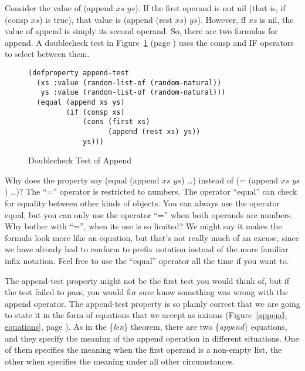 Consider the value of (append $xs$ $ys$).
If the first operand is not nil (that is, if (consp $xs$) is true),
that value is (append (rest $xs$) $ys$).
However, ff $xs$ is nil, the value of append
is simply its second operand.
So, there are two formulas for append.
A doublecheck test in Figure~\ref{fig:append-test} (page \pageref{fig:append-test}) 
uses the consp and IF operators to select between them.

\begin{figure}
\begin{Verbatim}
(defproperty append-test
  (xs :value (random-list-of (random-natural))
   ys :value (random-list-of (random-natural)))
  (equal (append xs ys)
         (if (consp xs)
             (cons (first xs)
                   (append (rest xs) ys))
             ys)))
\end{Verbatim}
\caption{Doublecheck Test of Append}
\label{fig:append-test}
\end{figure}

\begin{aside}
Why does the property say (equal (append $xs$ $ys$) \dots)
instead of (= (append $xs$ $ys$) \dots)?
The ``='' operator
is restricted to numbers. The operator ``equal'' can check
for equality between other kinds of objects.
You can always use the operator equal,
but you can only use the operator ``='' when both operands are numbers.
Why bother with ``='', when its use is so limited?
We might say it makes the formula look more like an equation,
but that's not really much of an excuse,
since we have already had to conform to prefix notation
instead of the more familiar infix notation.
Feel free to use the ``equal'' operator all the time if you want to.
\caption{``equal'' vs ``=''}
\label{equal}
\end{aside}

The append-test property might not be the first test you would think of,
but if the test failed to pass,
you would for sure know something was wrong with the append operator.
The append-test property is so plainly correct that
we are going to state it in the form of equations that we accept as axioms
(Figure~\ref{append-equations}, page \pageref{append-equations}).
As in the \{\emph{len}\} theorem, there are two \{\emph{append}\} equations,
and they specify the meaning of the append operation in different situations.
One of them specifies the meaning when the first operand is a non-empty list,
the other when specifies the meaning under all other circumstances.

